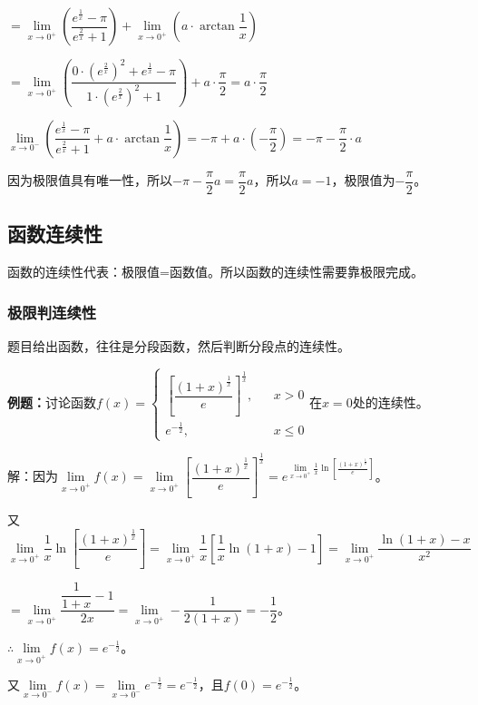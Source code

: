 \documentclass[UTF8, 12pt]{ctexart}
\begin{document}
$=\lim\limits_{x\to 0^+}\left(\dfrac{e^{\frac{1}{x}}-\pi}{e^{\frac{2}{x}}+1}\right)+\lim\limits_{x\to 0^+}\left(a\cdot\arctan\dfrac{1}{x}\right)$

$=\lim\limits_{x\to 0^+}\left(\dfrac{0\cdot\left(e^{\frac{2}{x}}\right)^2+e^{\frac{1}{x}}-\pi}{1\cdot\left(e^{\frac{2}{x}}\right)^2+1}\right)+a\cdot\dfrac{\pi}{2}=a\cdot\dfrac{\pi}{2}$

\medskip

$\lim\limits_{x\to 0^-}\left(\dfrac{e^{\frac{1}{x}}-\pi}{e^{\frac{2}{x}}+1}+a\cdot\arctan\dfrac{1}{x}\right)=-\pi+a\cdot\left(-\dfrac{\pi}{2}\right)=-\pi-\dfrac{\pi}{2}\cdot a$

因为极限值具有唯一性，所以$-\pi-\dfrac{\pi}{2}a=\dfrac{\pi}{2}a$，所以$a=-1$，极限值为$-\dfrac{\pi}{2}$。

\subsection{函数连续性}

函数的连续性代表：极限值=函数值。所以函数的连续性需要靠极限完成。

\subsubsection{极限判连续性}

题目给出函数，往往是分段函数，然后判断分段点的连续性。\medskip

\textbf{例题：}讨论函数$f(x)=\left\{\begin{array}{lcl}
    \left[\dfrac{(1+x)^{\frac{1}{x}}}{e}\right]^{\frac{1}{x}},& & x>0 \\
    e^{-\frac{1}{2}}, & & x\leqslant 0
\end{array}\right.$在$x=0$处的连续性。

解：因为$\lim\limits_{x\to 0^+}f(x)=\lim\limits_{x\to 0^+}\left[\dfrac{(1+x)^{\frac{1}{x}}}{e}\right]^{\frac{1}{x}}=e^{\lim\limits_{x\to 0^+}\frac{1}{x}\ln[\frac{(1+x)^{\frac{1}{x}}}{e}]}$。

又$\lim\limits_{x\to 0^+}\dfrac{1}{x}\ln\left[\dfrac{(1+x)^{\frac{1}{x}}}{e}\right]=\lim\limits_{x\to 0^+}\dfrac{1}{x}\left[\dfrac{1}{x}\ln(1+x)-1\right]=\lim\limits_{x\to 0^+}\dfrac{\ln(1+x)-x}{x^2}$

$=\lim\limits_{x\to 0^+}\dfrac{\dfrac{1}{1+x}-1}{2x}=\lim\limits_{x\to 0^+}-\dfrac{1}{2(1+x)}=-\dfrac{1}{2}$。

$\therefore\lim\limits_{x\to 0^+}f(x)=e^{-\frac{1}{2}}$。

又$\lim\limits_{x\to 0^-}f(x)=\lim\limits_{x\to 0^-}e^{-\frac{1}{2}}=e^{-\frac{1}{2}}$，且$f(0)=e^{-\frac{1}{2}}$。
\end{document}
